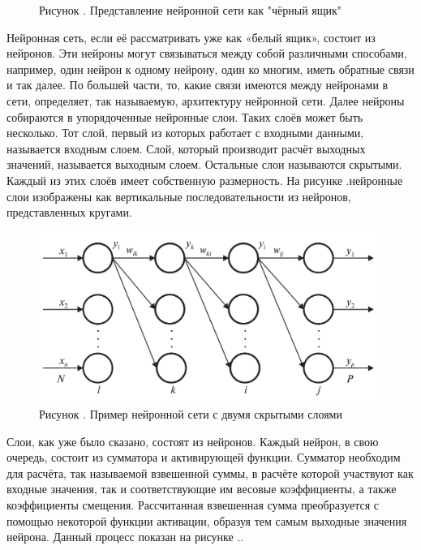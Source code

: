 {  \begin{figure}
    \centering
    \def\svgwidth{\textwidth}
    
    \caption*{\gostFont Рисунок \thechaptercntr .\theimagecntr \spc {--} Представление нейронной сети как "чёрный ящик"}
    \label{fig:NNBlackBox}
  \end{figure} \addtocounter{imagecntr}{1}

  \par \redline Нейронная сеть, если её рассматривать уже как «белый ящик», состоит из нейронов. Эти нейроны могут связываться между собой различными способами, например, один нейрон к одному нейрону, один ко многим, иметь обратные связи и так далее. По большей части, то, какие связи имеются между нейронами в сети, определяет, так называемую, архитектуру нейронной сети. Далее нейроны собираются в упорядоченные нейронные слои. Таких слоёв может быть несколько. Тот слой, первый из которых работает с входными данными, называется входным слоем. Слой, который производит расчёт выходных значений, называется выходным слоем. Остальные слои называются скрытыми. Каждый из этих слоёв имеет собственную размерность. На рисунке \thechaptercntr .\theimagecntr \spc нейронные слои изображены как вертикальные последовательности из нейронов, представленных кругами.

  \begin{figure}[H]
    \centering
    \def\svgwidth{\textwidth}
    \includegraphics[width=155mm]{images/NNWhiteBox.png}
    \caption*{\gostFont Рисунок \thechaptercntr .\theimagecntr \spc {--} Пример нейронной сети с двумя скрытыми слоями}
    \label{fig:NNWhiteBox}
  \end{figure} \addtocounter{imagecntr}{1}

  \par \redline Слои, как уже было сказано, состоят из нейронов. Каждый нейрон, в свою очередь, состоит из сумматора и активирующей функции. Сумматор необходим для расчёта, так называемой взвешенной суммы, в расчёте которой участвуют как входные значения, так и соответствующие им весовые коэффициенты, а также коэффициенты смещения. Рассчитанная взвешенная сумма преобразуется с помощью некоторой функции активации, образуя тем самым выходные значения нейрона. Данный процесс показан на рисунке \thechaptercntr .\theimagecntr.

}
